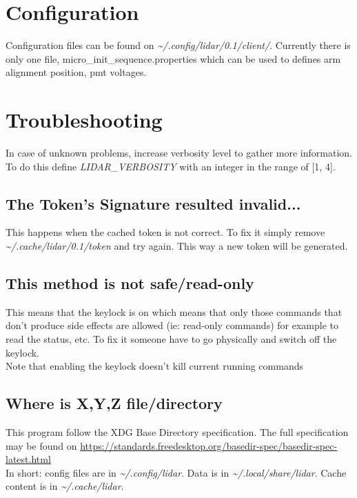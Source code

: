 \documentclass[letterpaper, 10 pt]{article}
\begin{document}
\section{Configuration}
Configuration files can be found on \textit{\~{}/.config/lidar/0.1/client/}. Currently there is only one file, micro\_init\_sequence.properties which can be used to defines arm alignment position, pmt voltages.

\section{Troubleshooting}
In case of unknown problems, increase verbosity level to gather more information. To do this define \emph{LIDAR\_VERBOSITY} with an integer in the range of [1, 4].
\subsection{The Token's Signature resulted invalid...}
This happens when the cached token is not correct. To fix it simply remove \textit{\~{}/.cache/lidar/0.1/token} and try again. This way a new token will be generated.\\
\subsection{This method is not safe/read-only}
This means that the keylock is on which means that only those commands that don't produce side effects are allowed (ie: read-only commands) for example to read the status, etc. To fix it someone have to go physically and switch off the keylock.\\
Note that enabling the keylock doesn't kill current running commands
\subsection{Where is X,Y,Z file/directory}
This program follow the XDG Base Directory specification. The full specification may be found on \url{https://standards.freedesktop.org/basedir-spec/basedir-spec-latest.html}\\
\linebreak
In short: config files are in \textit{ \~{}/.config/lidar}. Data is in \textit{\~{}/.local/share/lidar}. Cache content is in \textit{\~{}/.cache/lidar}.

\newpage

%
\end{document}
